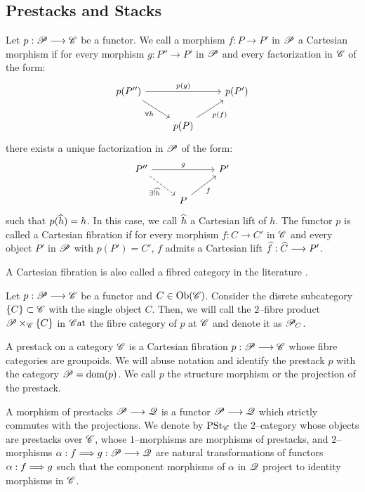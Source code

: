 \documentclass[11pt]{amsart}
\begin{document}
\subsection{Prestacks and Stacks}
\label{subsec:prest-st}

\begin{defn}
Let $p : \sP \to \sC$ be a functor. We call a morphism $f : P \to P'$ in $\mathscr{P}$ a Cartesian morphism
if for every morphism $g : P'' \to P'$ in $\mathscr{P}$ and every factorization in $\mathscr{C}$ of the form:
\[\begin{tikzcd}
p(P'') \ar[rd, "\forall h" below left] \ar[rr, "p(g)"] & & p(P') \\
& p(P) \ar[ru, "p(f)" below right] &
\end{tikzcd}\]
there exists a unique factorization in $\mathscr{P}$ of the form:
\[\begin{tikzcd}
P'' \ar[rd, dashed, "\exists ! \wh{h}" below left] \ar[rr, "g"] & & P' \\
& P \ar[ru, "f" below right] &
\end{tikzcd}\]
such that $p(\widehat{h}) = h$. In this case, we call $\widehat{h}$ a Cartesian lift of $h$.
The functor $p$ is called a Cartesian fibration if for every morphism $f : C \to C'$
in $\mathscr{C}$ and every object $P'$ in $\mathscr{P}$ with $p(P') = C'$, $f$ admits a Cartesian lift
$\wh{f} : \wh{C} \to P'$.
\end{defn}

\begin{rmk}
A Cartesian fibration is also called a fibred category in the literature
\cite[\href{https://stacks.math.columbia.edu/tag/02XJ}{Section 02XJ}]{stacks-project}.
\end{rmk}

\begin{defn}
Let $p : \sP \to \sC$ be a functor and $C \in \Ob{\sC}$. Consider the disrete subcategory
$\set{C} \subset \sC$ with the single object $C$. Then, we will call the $2$--fibre product
$\sP \times_\sC \set{C}$ in $\mathscr{C}\mathrm{at}$ the fibre category of $p$ at $\mathscr{C}$ and denote it as $\mathscr{P}_C$.
\end{defn}

\begin{defn}[Prestack]
A prestack on a category $\mathscr{C}$ is a Cartesian fibration $p : \sP \to \sC$ whose fibre categories
are groupoids.
We will abuse notation and identify the prestack $p$ with the category $\mathscr{P} = \mathrm{dom}(p)$.
We call $p$ the structure morphism or the projection of the prestack.

A morphism of prestacks $\sP \to \sQ$ is a functor $\sP \to \sQ$ which strictly
commutes with the projections.
We denote by $\mathrm{PSt}_{\mathscr{C}}$ the $2$--category whose objects are prestacks over $\mathscr{C}$,
whose $1$--morphisms are morphisms of prestacks, and $2$--morphisms
$\alpha : f \To g : \sP \to \sQ$ are natural transformations of functors $\alpha : f \To g$
such that the component morphisms of $\alpha$ in $\mathscr{Q}$ project to identity morphisms in $\mathscr{C}$.
\end{defn}
\end{document}

